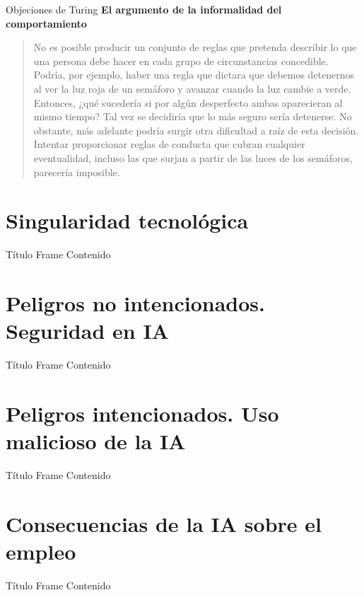 \documentclass{beamer}
\begin{document}
\begin{frame}{Objeciones de Turing}
\textbf{El argumento de la informalidad del comportamiento}
\begin{quote}\small No es posible producir un conjunto de reglas que pretenda describir lo que una persona debe hacer en cada grupo de circunstancias concedible. Podría, por ejemplo, haber una regla que dictara que debemos detenernos al ver la luz roja de un semáforo y avanzar cuando la luz cambie a verde. Entonces, ¿qué sucedería si por algún desperfecto ambas aparecieran al mismo tiempo? Tal vez se decidiría que lo más seguro sería detenerse. No obstante, más adelante podría surgir otra dificultad a raíz de esta decisión. Intentar proporcionar reglas de conducta que cubran cualquier eventualidad, incluso las que surjan a partir de las luces de los semáforos, parecería imposible.
\end{quote}
\end{frame}

\section{Singularidad tecnológica}
\begin{frame}{Título Frame}
Contenido
\end{frame}

\section{Peligros no intencionados. Seguridad en IA}
\begin{frame}{Título Frame}
Contenido
\end{frame}

\section{Peligros intencionados. Uso malicioso de la IA}
\begin{frame}{Título Frame}
Contenido
\end{frame}

\section{Consecuencias de la IA sobre el empleo}
\begin{frame}{Título Frame}
Contenido
\end{frame}
\end{document}
